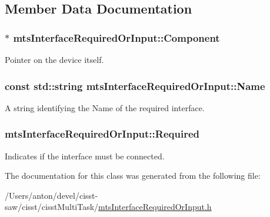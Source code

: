 \subsection{Member Data Documentation}
\hypertarget{classmts_interface_required_or_input_a671dde64d1580dde3b87a8fc97ac9462}{}
\subsubsection[{Component}]{$\ast$ mts\+Interface\+Required\+Or\+Input\+::\+Component\hspace{0.3cm}{\ttfamily [protected]}}\label{classmts_interface_required_or_input_a671dde64d1580dde3b87a8fc97ac9462}
Pointer on the device itself. \hypertarget{classmts_interface_required_or_input_aeaaf350b344d0b697b19c6f642b67317}{}
\subsubsection[{Name}]{\setlength{\rightskip}{0pt plus 5cm}const std\+::string mts\+Interface\+Required\+Or\+Input\+::\+Name\hspace{0.3cm}{\ttfamily [protected]}}\label{classmts_interface_required_or_input_aeaaf350b344d0b697b19c6f642b67317}
A string identifying the \textquotesingle{}Name\textquotesingle{} of the required interface. \hypertarget{classmts_interface_required_or_input_ac0ae074f8fe197420257c16e1f0f7db2}{}
\subsubsection[{Required}]{ mts\+Interface\+Required\+Or\+Input\+::\+Required\hspace{0.3cm}{\ttfamily [protected]}}\label{classmts_interface_required_or_input_ac0ae074f8fe197420257c16e1f0f7db2}
Indicates if the interface must be connected. 

The documentation for this class was generated from the following file\+:\begin{DoxyCompactItemize}
\item 
/\+Users/anton/devel/cisst-\/saw/cisst/cisst\+Multi\+Task/\hyperlink{mts_interface_required_or_input_8h}{mts\+Interface\+Required\+Or\+Input.\+h}\end{DoxyCompactItemize}
